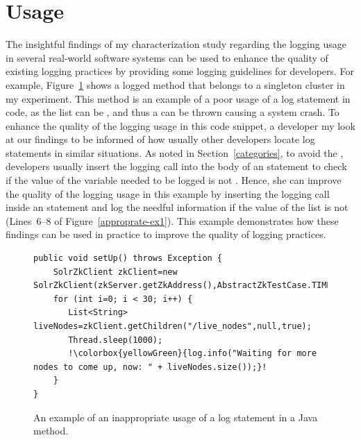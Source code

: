 


\section{Usage}  \label{usageELUS}
The insightful findings of my characterization study regarding the logging usage in several real-world software systems can be used to enhance the quality of existing logging practices by providing some logging guidelines for developers. For example, Figure~\ref{inapproprate-ex1} shows a logged method that belongs to a singleton cluster in my experiment. This  method is an example of a poor usage of a log statement in code, as the list  can be , and thus a  can be thrown causing a system crash. To enhance the quality of the logging usage in this code snippet, a developer my look at our findings to be informed of how usually other developers locate log statements in similar situations. As noted in Section~\ref{categories}, to avoid the , developers usually insert the logging call into the body of an  statement to check if the value of the variable needed to be logged is not . Hence, she can improve the quality of the logging usage in this example by inserting the logging call inside an  statement and log the needful information if the value of the list  is not  (Lines~6--8 of Figure~\ref{approprate-ex1}). This example demonstrates how these findings can be used in practice to improve the quality of logging practices.


\begin{figure}[p]
\def\baselinestretch{1}
\begin{lstlisting}[escapechar=!]
public void setUp() throws Exception {
    SolrZkClient zkClient=new SolrZkClient(zkServer.getZkAddress(),AbstractZkTestCase.TIMEOUT);
    for (int i=0; i < 30; i++) {
       List<String> liveNodes=zkClient.getChildren("/live_nodes",null,true);
       Thread.sleep(1000);
       !\colorbox{yellowGreen}{log.info("Waiting for more nodes to come up, now: " + liveNodes.size());}! 
    }
}
\end{lstlisting}
\caption[Example 1: An example of an inappropriate usage of a log statement in a Java method.]{An example of an inappropriate usage of a log statement in a Java method.\label{inapproprate-ex1}}
\end{figure}




